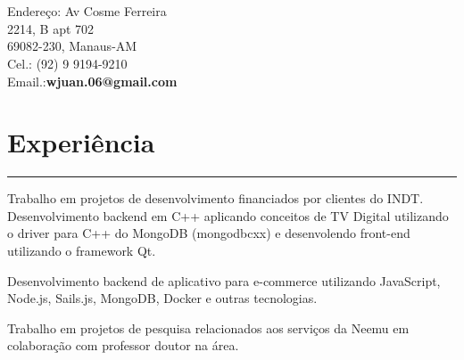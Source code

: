 \documentclass[]{rahulworld-resume}
\begin{document}
\begin{minipage}[t]{0.66\textwidth} 
\hspace*{0pt}\hfill    \\
\hspace*{0pt}\hfill    \\
\hspace*{0pt}\hfill Endereço: Av Cosme Ferreira \\
\hspace*{0pt}\hfill 2214, B apt 702 \\
\hspace*{0pt}\hfill 69082-230, Manaus-AM \\
\hspace*{0pt}\hfill Cel.: (92) 9 9194-9210 \\
\hspace*{0pt}\hfill Email.:\textbf{wjuan.06@gmail.com} \\
\section{Experiência}
\noindent\rule{12.5cm}{0.4pt}
 
\noindent
\hspace{5em}%
\begin{minipage}{0.85\textwidth\vspace{2pt}}
Trabalho em projetos de desenvolvimento financiados por clientes do INDT. 
Desenvolvimento backend em C++ aplicando conceitos de TV Digital utilizando o driver para C++ do MongoDB (mongodbcxx) e desenvolendo front-end utilizando o framework Qt. 
\end{minipage}
\sectionsep

 
\noindent
\hspace{5em}%
\begin{minipage}{0.85\textwidth\vspace{2pt}}
Desenvolvimento backend de aplicativo para e-commerce utilizando JavaScript, Node.js, Sails.js, MongoDB, Docker e outras tecnologias.
\end{minipage}
\sectionsep

 
\noindent
\hspace{5em}%
\begin{minipage}{0.85\textwidth\vspace{2pt}}
Trabalho em projetos de pesquisa relacionados aos serviços da Neemu em colaboração com professor doutor na área. 
\end{minipage}

\end{minipage}
\end{document}
